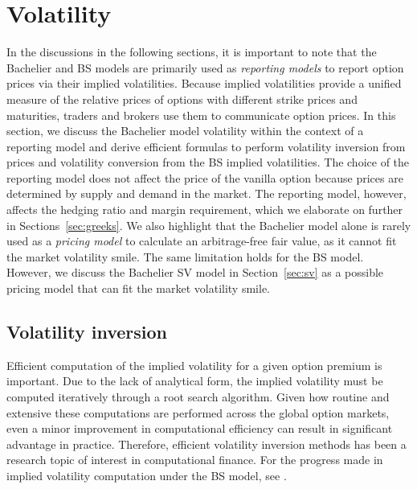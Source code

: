 \documentclass[a4paper,review]{elsarticle}
\begin{document}
\section{Volatility} \label{sec:vol} \noindent
In the discussions in the following sections, it is important to note that the Bachelier and BS models are primarily used as \textit{reporting models} to report option prices via their implied volatilities. Because implied volatilities provide a unified measure of the relative prices of options with different strike prices and maturities, traders and brokers use them to communicate option prices. In this section, we discuss the Bachelier model volatility within the context of a reporting model and derive efficient formulas to perform volatility inversion from prices and volatility conversion from the BS implied volatilities. The choice of the reporting model does not affect the price of the vanilla option because prices are determined by supply and demand in the market. The reporting model, however, affects the hedging ratio and margin requirement, which we elaborate on further in Sections~\ref{sec:greeks}.
We also highlight that the Bachelier model alone is rarely used as a \textit{pricing model} to calculate an arbitrage-free fair value, as it cannot fit the market volatility smile. The same limitation holds for the BS model. However, we discuss the Bachelier SV model in Section~\ref{sec:sv} as a possible pricing model that can fit the market volatility smile.

\subsection{Volatility inversion} \label{ssec:iv} \noindent
Efficient computation of the implied volatility for a given option premium is important. Due to the lack of analytical form, the implied volatility must be computed iteratively through a root search algorithm. Given how routine and extensive these computations are performed across the global option markets, even a minor improvement in computational efficiency can result in significant advantage in practice. Therefore, efficient volatility inversion methods has been a research topic of interest in computational finance. For the progress made in implied volatility computation under the BS model, see \citet{li2008approx,jackel2015let,stefanica2017explicit,potz2019chebyshev}.
\end{document}
